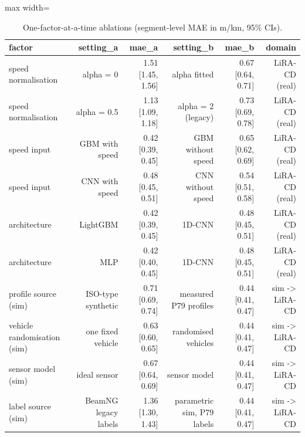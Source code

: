 \begin{table}[!htbp]
\centering
\footnotesize
\caption{One-factor-at-a-time ablations (segment-level MAE in m/km, 95\% CIs).}
\label{tab:ablations}
\begin{adjustbox}{max width=\columnwidth}
\begin{tabular}{lrrrrr}
\toprule
\textbf{factor} & \textbf{setting\_a} & \textbf{mae\_a} & \textbf{setting\_b} & \textbf{mae\_b} & \textbf{domain} \\
\midrule
speed normalisation & alpha = 0 & 1.51 [1.45, 1.56] & alpha fitted & 0.67 [0.64, 0.71] & LiRA-CD (real) \\
speed normalisation & alpha = 0.5 & 1.13 [1.09, 1.18] & alpha = 2 (legacy) & 0.73 [0.69, 0.78] & LiRA-CD (real) \\
speed input & GBM with speed & 0.42 [0.39, 0.45] & GBM without speed & 0.65 [0.62, 0.69] & LiRA-CD (real) \\
speed input & CNN with speed & 0.48 [0.45, 0.51] & CNN without speed & 0.54 [0.51, 0.58] & LiRA-CD (real) \\
architecture & LightGBM & 0.42 [0.39, 0.45] & 1D-CNN & 0.48 [0.45, 0.51] & LiRA-CD (real) \\
architecture & MLP & 0.42 [0.40, 0.45] & 1D-CNN & 0.48 [0.45, 0.51] & LiRA-CD (real) \\
profile source (sim) & ISO-type synthetic & 0.71 [0.69, 0.74] & measured P79 profiles & 0.44 [0.41, 0.47] & sim -\textgreater{} LiRA-CD \\
vehicle randomisation (sim) & one fixed vehicle & 0.63 [0.60, 0.65] & randomised vehicles & 0.44 [0.41, 0.47] & sim -\textgreater{} LiRA-CD \\
sensor model (sim) & ideal sensor & 0.67 [0.64, 0.69] & sensor model & 0.44 [0.41, 0.47] & sim -\textgreater{} LiRA-CD \\
label source (sim) & BeamNG legacy labels & 1.36 [1.30, 1.43] & parametric sim, P79 labels & 0.44 [0.41, 0.47] & sim -\textgreater{} LiRA-CD \\
\bottomrule
\end{tabular}
\end{adjustbox}
\end{table}
